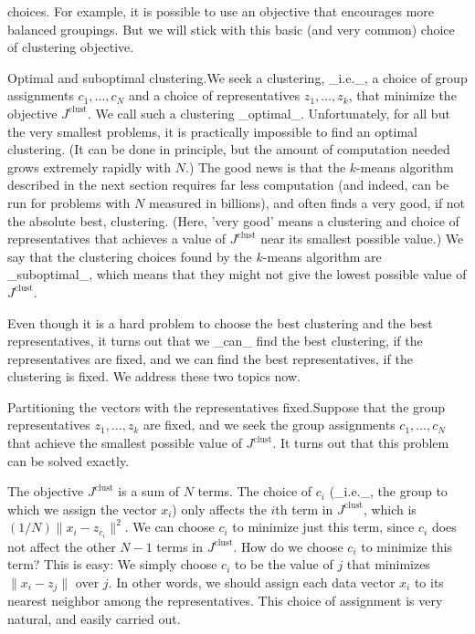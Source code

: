 choices. For example, it is possible to use an objective that encourages more balanced groupings. But we will stick with this basic (and very common) choice of clustering objective.

Optimal and suboptimal clustering.We seek a clustering, _i.e._, a choice of group assignments \(c_{1},\ldots,c_{N}\) and a choice of representatives \(z_{1},\ldots,z_{k}\), that minimize the objective \(J^{\mathrm{clust}}\). We call such a clustering _optimal_. Unfortunately, for all but the very smallest problems, it is practically impossible to find an optimal clustering. (It can be done in principle, but the amount of computation needed grows extremely rapidly with \(N\).) The good news is that the \(k\)-means algorithm described in the next section requires far less computation (and indeed, can be run for problems with \(N\) measured in billions), and often finds a very good, if not the absolute best, clustering. (Here, 'very good' means a clustering and choice of representatives that achieves a value of \(J^{\mathrm{clust}}\) near its smallest possible value.) We say that the clustering choices found by the \(k\)-means algorithm are _suboptimal_, which means that they might not give the lowest possible value of \(J^{\mathrm{clust}}\).

Even though it is a hard problem to choose the best clustering and the best representatives, it turns out that we _can_ find the best clustering, if the representatives are fixed, and we can find the best representatives, if the clustering is fixed. We address these two topics now.

Partitioning the vectors with the representatives fixed.Suppose that the group representatives \(z_{1},\ldots,z_{k}\) are fixed, and we seek the group assignments \(c_{1},\ldots,c_{N}\) that achieve the smallest possible value of \(J^{\mathrm{clust}}\). It turns out that this problem can be solved exactly.

The objective \(J^{\mathrm{clust}}\) is a sum of \(N\) terms. The choice of \(c_{i}\) (_i.e._, the group to which we assign the vector \(x_{i}\)) only affects the \(i\)th term in \(J^{\mathrm{clust}}\), which is \((1/N)\|x_{i}-z_{c_{i}}\|^{2}\). We can choose \(c_{i}\) to minimize just this term, since \(c_{i}\) does not affect the other \(N-1\) terms in \(J^{\mathrm{clust}}\). How do we choose \(c_{i}\) to minimize this term? This is easy: We simply choose \(c_{i}\) to be the value of \(j\) that minimizes \(\|x_{i}-z_{j}\|\) over \(j\). In other words, we should assign each data vector \(x_{i}\) to its nearest neighbor among the representatives. This choice of assignment is very natural, and easily carried out.

